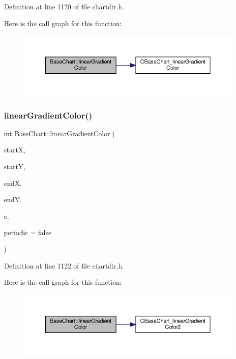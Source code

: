 Definition at line 1120 of file chartdir.\+h.

Here is the call graph for this function\+:
\nopagebreak
\begin{figure}[H]
\begin{center}
\leavevmode
\includegraphics[width=350pt]{class_base_chart_af58f13bbae3eb6f0ac2669ceaa4ae935_cgraph}
\end{center}
\end{figure}
\mbox{\label{class_base_chart_ace8cbeb2885b2141b081f26a85339eff}} 
\subsubsection{\texorpdfstring{linear\+Gradient\+Color()}{linearGradientColor()}\hspace{0.1cm}{\footnotesize\ttfamily [2/2]}}
{\footnotesize\ttfamily int Base\+Chart\+::linear\+Gradient\+Color (\begin{DoxyParamCaption}\item[{int}]{startX,  }\item[{int}]{startY,  }\item[{int}]{endX,  }\item[{int}]{endY,  }\item[{\hyperlink{class_int_array}{Int\+Array}}]{c,  }\item[{bool}]{periodic = {\ttfamily false} }\end{DoxyParamCaption})\hspace{0.3cm}{\ttfamily [inline]}}



Definition at line 1122 of file chartdir.\+h.

Here is the call graph for this function\+:
\nopagebreak
\begin{figure}[H]
\begin{center}
\leavevmode
\includegraphics[width=350pt]{class_base_chart_ace8cbeb2885b2141b081f26a85339eff_cgraph}
\end{center}
\end{figure}
\mbox{\label{class_base_chart_aa5c1afc94d6cc856f3d34b886e88748a}} 
